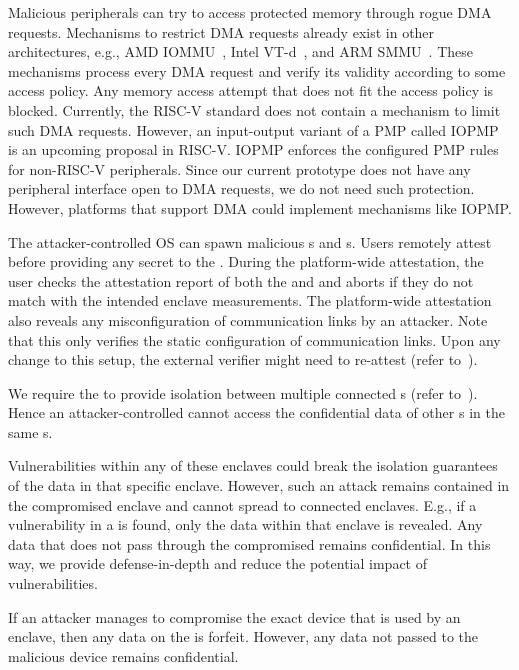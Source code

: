 Malicious peripherals can try to access protected memory through rogue DMA requests. 
Mechanisms to restrict DMA requests already exist in other architectures, e.g., AMD IOMMU~\cite{amd2007iommu}, Intel VT-d~\cite{abramson2006vtd}, and ARM SMMU~\cite{arm2013smmu}. These mechanisms process every DMA request and verify its validity according to some access policy. Any memory access attempt that does not fit the access policy is blocked. Currently, the RISC-V standard does not contain a mechanism to limit such DMA requests. However, an input-output variant of a PMP called IOPMP~\cite{IOPMP} is an upcoming proposal in RISC-V. IOPMP enforces the configured PMP rules for non-RISC-V peripherals. Since our current prototype does not have any peripheral interface open to DMA requests, we do not need such protection. However, platforms that support DMA could implement mechanisms like IOPMP.

The attacker-controlled OS can spawn malicious \app{}s and \ce{}s. Users remotely attest before providing any secret to the \app. During the platform-wide attestation, the user checks the attestation report of both the \app and \ce and aborts if they do not match with the intended enclave measurements. The platform-wide attestation also reveals any misconfiguration of communication links by an attacker. Note that this only verifies the static configuration of communication links. Upon any change to this setup, the external verifier might need to re-attest (refer to~). 

We require the \ce{} to provide isolation between multiple connected \app{}s (refer to~). Hence an attacker-controlled \app cannot access the confidential data of other \app{}s in the same \ce{}s.

Vulnerabilities within any of these enclaves could break the isolation guarantees of the data in that specific enclave. However, such an attack remains contained in the compromised enclave and cannot spread to connected enclaves. E.g., if a vulnerability in a \ce{} is found, only the data within that enclave is revealed. Any data that does not pass through the compromised \ce remains confidential. In this way, we provide defense-in-depth and reduce the potential impact of vulnerabilities.

If an attacker manages to compromise the exact device that is used by an enclave, then any data on the \sphw is forfeit. However, any data not passed to the malicious device remains confidential.


